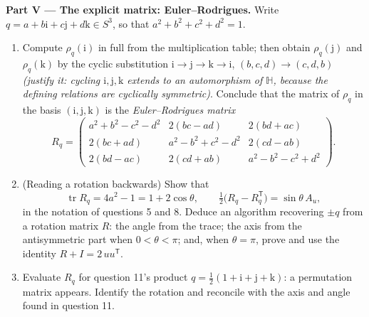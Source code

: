 \begin{problem}
\medskip
\noindent\textbf{Part V --- The explicit matrix:
Euler--Rodrigues.} Write $q = a + b\mathrm i + c\mathrm j +
d\mathrm k \in S^3$, so that $a^2 + b^2 + c^2 + d^2 = 1$.
\begin{enumerate}[resume]
  \item Compute $\rho_q(\mathrm i)$ in full from the
        multiplication table; then obtain $\rho_q(\mathrm
        j)$ and $\rho_q(\mathrm k)$ by the cyclic
        substitution $\mathrm i \to \mathrm j \to \mathrm k
        \to \mathrm i$, $(b, c, d) \to (c, d, b)$
        \emph{(justify it: cycling $\mathrm i, \mathrm j,
        \mathrm k$ extends to an automorphism of $\mathbb
        H$, because the defining relations are cyclically
        symmetric)}. Conclude that the matrix of $\rho_q$
        in the basis $(\mathrm i, \mathrm j, \mathrm k)$ is
        the \emph{Euler--Rodrigues matrix}
        \[
        R_q = \begin{pmatrix}
        a^2 + b^2 - c^2 - d^2 & 2(bc - ad) & 2(bd + ac)\\
        2(bc + ad) & a^2 - b^2 + c^2 - d^2 & 2(cd - ab)\\
        2(bd - ac) & 2(cd + ab) & a^2 - b^2 - c^2 + d^2
        \end{pmatrix}.
        \]
  \item (Reading a rotation backwards) Show that
        \[
        \operatorname{tr}R_q = 4a^2 - 1 = 1 + 2\cos\theta,
        \qquad
        \tfrac12\bigl(R_q - R_q^{\mathsf T}\bigr) =
        \sin\theta\,A_u,
        \]
        in the notation of questions 5 and 8. Deduce an
        algorithm recovering $\pm q$ from a rotation matrix
        $R$: the angle from the trace; the axis from the
        antisymmetric part when $0 < \theta < \pi$; and,
        when $\theta = \pi$, prove and use the identity $R
        + I = 2\,uu^{\mathsf T}$.
  \item Evaluate $R_q$ for question 11's product $q =
        \frac12(1 + \mathrm i + \mathrm j + \mathrm k)$: a
        permutation matrix appears. Identify the rotation
        and reconcile with the axis and angle found in
        question 11.
\end{enumerate}


\end{problem}
